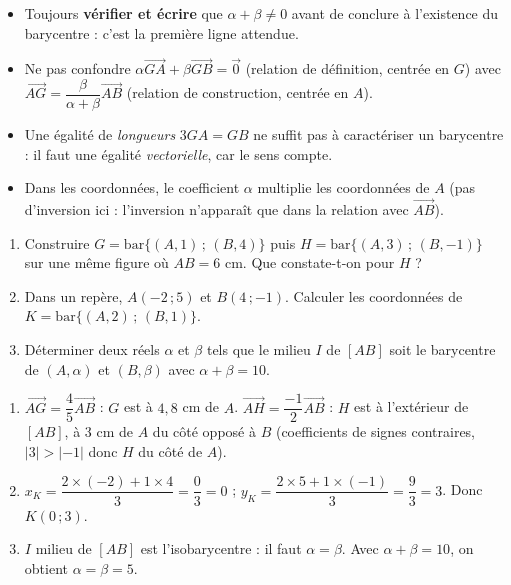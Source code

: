 \documentclass[11pt]{article}
\begin{document}
\begin{attention}
\begin{itemize}
\item Toujours \textbf{vérifier et écrire} que $\alpha + \beta \neq 0$ avant de conclure à l'existence du barycentre : c'est la première ligne attendue.
\item Ne pas confondre $\alpha\overrightarrow{GA} + \beta\overrightarrow{GB} = \vec{0}$ (relation de définition, centrée en $G$) avec $\overrightarrow{AG} = \dfrac{\beta}{\alpha+\beta}\overrightarrow{AB}$ (relation de construction, centrée en $A$).
\item Une égalité de \emph{longueurs} $3GA = GB$ ne suffit pas à caractériser un barycentre : il faut une égalité \emph{vectorielle}, car le sens compte.
\item Dans les coordonnées, le coefficient $\alpha$ multiplie les coordonnées de $A$ (pas d'inversion ici : l'inversion n'apparaît que dans la relation avec $\overrightarrow{AB}$).
\end{itemize}
\end{attention}

\begin{exercice}
\begin{enumerate}
\item Construire $G = \mathrm{bar}\{(A,1)\,;\,(B,4)\}$ puis $H = \mathrm{bar}\{(A,3)\,;\,(B,-1)\}$ sur une même figure où $AB = 6$ cm. Que constate-t-on pour $H$ ?
\item Dans un repère, $A(-2\,;5)$ et $B(4\,;-1)$. Calculer les coordonnées de $K = \mathrm{bar}\{(A,2)\,;\,(B,1)\}$.
\item Déterminer deux réels $\alpha$ et $\beta$ tels que le milieu $I$ de $[AB]$ soit le barycentre de $(A,\alpha)$ et $(B,\beta)$ avec $\alpha + \beta = 10$.
\end{enumerate}
\end{exercice}

\begin{corrige}[Exercice]
\begin{enumerate}
\item $\overrightarrow{AG} = \dfrac{4}{5}\overrightarrow{AB}$ : $G$ est à $4{,}8$ cm de $A$. $\overrightarrow{AH} = \dfrac{-1}{2}\overrightarrow{AB}$ : $H$ est à l'extérieur de $[AB]$, à $3$ cm de $A$ du côté opposé à $B$ (coefficients de signes contraires, $|3| > |-1|$ donc $H$ du côté de $A$).
\item $x_K = \dfrac{2\times(-2) + 1\times 4}{3} = \dfrac{0}{3} = 0$ ; $y_K = \dfrac{2\times 5 + 1\times(-1)}{3} = \dfrac{9}{3} = 3$. Donc $K(0\,;3)$.
\item $I$ milieu de $[AB]$ est l'isobarycentre : il faut $\alpha = \beta$. Avec $\alpha + \beta = 10$, on obtient $\alpha = \beta = 5$.
\end{enumerate}
\end{corrige}
\end{document}
